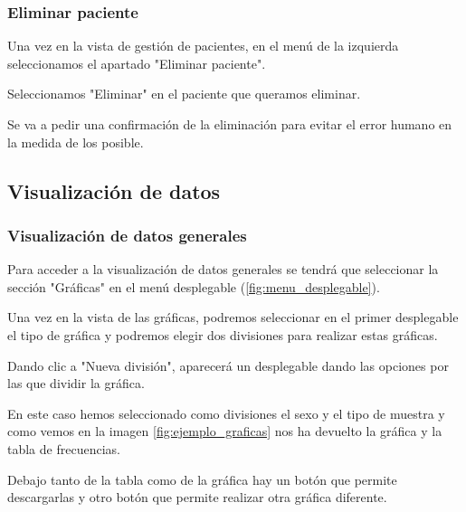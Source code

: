 
\subsubsection{Eliminar paciente}

Una vez en la vista de gestión de pacientes, en el menú de la izquierda seleccionamos el apartado "{}Eliminar paciente".


Seleccionamos "{}Eliminar"{} en el paciente que queramos eliminar.


Se va a pedir una confirmación de la eliminación para evitar el error humano en la medida de los posible.


\subsection{Visualización de datos}

\subsubsection{Visualización de datos generales}

Para acceder a la visualización de datos generales se tendrá que seleccionar la sección "Gráficas"{} en el menú desplegable (\ref{fig:menu_desplegable}).


Una vez en la vista de las gráficas, podremos seleccionar en el primer desplegable el tipo de gráfica y podremos elegir dos divisiones para realizar estas gráficas.

Dando clic a "Nueva división{}"{}, aparecerá un desplegable dando las opciones por las que dividir la gráfica.


En este caso hemos seleccionado como divisiones el sexo y el tipo de muestra y como vemos en la imagen \ref{fig:ejemplo_graficas} nos ha devuelto la gráfica y la tabla de frecuencias.

Debajo tanto de la tabla como de la gráfica hay un botón que permite descargarlas y otro botón que permite realizar otra gráfica diferente.

